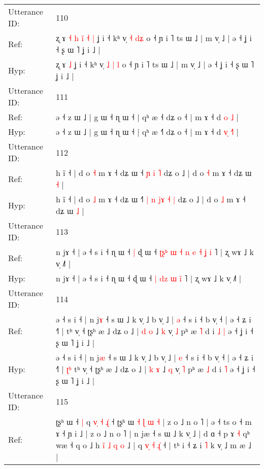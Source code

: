 \documentclass[10pt]{article}
\DeclareRobustCommand{\hl}[1]{{\textcolor{red}{#1}}}
\begin{document}
\begin{longtable}{ll}
\midrule
Utterance ID: & 110 \\
Ref: & ʐ ɤ\hl{ }\hl{˧}\hl{ }\hl{h}\hl{ }\hl{i}\hl{̃}\hl{ }\hl{˧} \hl{|} ʝ i ˧ kʰ v̩ \hl{˧} \hl{}\hl{d}\hl{ʑ} o ˧ ɲ i ˥ ts ɯ ˩ | m v̩ ˩ | ə ˧ ʝ i ˧ ʂ ɯ ˥ ʝ i ˩ |
 \\
Hyp: & ʐ ɤ\hl{}\hl{}\hl{}\hl{}\hl{}\hl{}\hl{}\hl{}\hl{} \hl{˩} ʝ i ˧ kʰ v̩ \hl{˩} \hl{|}\hl{ }\hl{l} o ˧ ɲ i ˥ ts ɯ ˩ | m v̩ ˩ | ə ˧ ʝ i ˧ ʂ ɯ ˥ ʝ i ˩ |
 \\
\midrule
Utterance ID: & 111 \\
Ref: & ə ˧ z ɯ ˩ | g ɯ ˧ ɳ ɯ ˧ | qʰ æ ˧\hl{} dʑ o ˧ | m ɤ ˧ d \hl{}\hl{o} \hl{}\hl{˩} |
 \\
Hyp: & ə ˧ z ɯ ˩ | g ɯ ˧ ɳ ɯ ˧ | qʰ æ ˧\hl{˥} dʑ o ˧ | m ɤ ˧ d \hl{v}\hl{̩} \hl{˧}\hl{˥} |
 \\
\midrule
Utterance ID: & 112 \\
Ref: & h ĩ ˧ | d o \hl{˧} m ɤ ˧ dʑ ɯ ˧\hl{}\hl{}\hl{}\hl{}\hl{} \hl{}\hl{ɲ} \hl{i} \hl{˥} dʑ o ˩ | d o \hl{˧} m ɤ ˧ dʑ ɯ \hl{˧} |
 \\
Hyp: & h ĩ ˧ | d o \hl{˩} m ɤ ˧ dʑ ɯ ˧\hl{˥}\hl{ }\hl{|}\hl{ }\hl{n} \hl{j}\hl{ɤ} \hl{˧} \hl{|} dʑ o ˩ | d o \hl{˩} m ɤ ˧ dʑ ɯ \hl{˩} |
 \\
\midrule
Utterance ID: & 113 \\
Ref: & n jɤ ˧ | ə ˧ s i ˧ ɳ ɯ ˧\hl{ }\hl{|} ɖ ɯ ˧\hl{ }\hl{ʈ}\hl{ʂ}\hl{ʰ}\hl{ }\hl{ɯ} \hl{˧} \hl{n}\hl{ }\hl{e} \hl{˧} \hl{ʝ}\hl{ }\hl{i} ˥ | ʐ wɤ ˩ k v̩ ˩˥ |
 \\
Hyp: & n jɤ ˧ | ə ˧ s i ˧ ɳ ɯ ˧\hl{}\hl{} ɖ ɯ ˧\hl{}\hl{}\hl{}\hl{}\hl{}\hl{} \hl{|} \hl{}\hl{d}\hl{z} \hl{ɯ} \hl{}\hl{i}\hl{̃} ˥ | ʐ wɤ ˩ k v̩ ˩˥ |
 \\
\midrule
Utterance ID: & 114 \\
Ref: & ə ˧ s i ˧ | n j\hl{ɤ} ˧ s ɯ ˩ k v̩ ˩ b v̩ ˩ | \hl{ə} ˧ s i ˧ b v̩ ˧ | ə ˧ ʑ i ˧˥ |\hl{}\hl{}\hl{} tʰ v̩ ˧ ʈʂʰ æ ˩ dʑ o ˩ | \hl{d} \hl{o} ˩ \hl{k} v̩ \hl{˩} pʰ æ \hl{˥} d i\hl{ }\hl{˩} \hl{|} ə ˧ ʝ i ˧ ʂ ɯ ˥ ʝ i ˩ |
 \\
Hyp: & ə ˧ s i ˧ | n j\hl{æ} ˧ s ɯ ˩ k v̩ ˩ b v̩ ˩ | \hl{e} ˧ s i ˧ b v̩ ˧ | ə ˧ ʑ i ˧˥ |\hl{ }\hl{ʈ}\hl{ʰ} tʰ v̩ ˧ ʈʂʰ æ ˩ dʑ o ˩ | \hl{k} \hl{ɤ} ˩ \hl{q} v̩ \hl{˥} pʰ æ \hl{˩} d i\hl{}\hl{} \hl{˥} ə ˧ ʝ i ˧ ʂ ɯ ˥ ʝ i ˩ |
 \\
\midrule
Utterance ID: & 115 \\
Ref: & ʈʂʰ ɯ ˧\hl{ }\hl{|} q\hl{ }\hl{v}\hl{̩}\hl{ }\hl{˧} \hl{ɻ}\hl{̍} ˧ ʈʂʰ ɯ \hl{˧} \hl{ɭ} \hl{ɯ} \hl{˧} | z o ˩ n o ˥ | ə ˧ ts o ˧ m ɤ ˧ ɲ i ˩ | z o ˩ n o ˥ | n jæ ˧ s ɯ ˩ k v̩ ˩ | d ɑ ˧ p ɤ\hl{}\hl{} \hl{˧} qʰ wæ ˧ q o ˩ h\hl{ }\hl{i}\hl{̃}\hl{ }\hl{˩} \hl{q}\hl{ }\hl{o} ˩ | q\hl{ }\hl{v}\hl{̩}\hl{ }\hl{˧} \hl{ɻ}\hl{̍} ˧ | tʰ i ˧ ʑ i \hl{˥} k v̩ ˩\hl{}\hl{} m æ ˩ |

\end{longtable}
\end{document}

